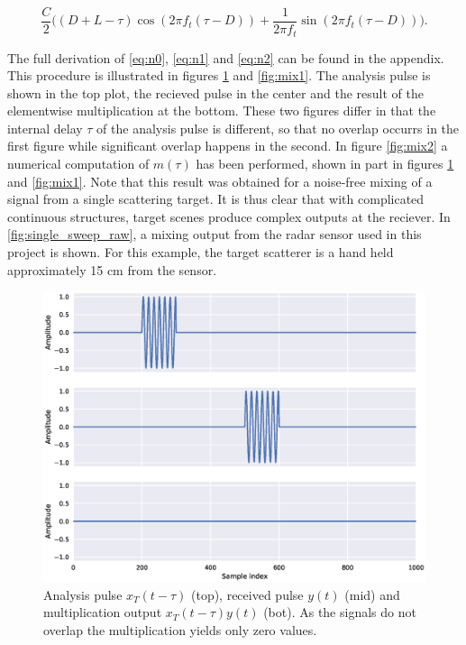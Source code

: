 \begin{equation}\label{eq:n2}
	\frac{C}{2}\Big((D + L - \tau)\cos(2\pi f_t(\tau - D)) 
	+ \frac{1}{2\pi f_t}\sin(2\pi f_t(\tau - D))\Big).
\end{equation}

The full derivation of \ref{eq:n0}, \ref{eq:n1} and \ref{eq:n2} can be found in the appendix. This procedure is illustrated in figures \ref{fig:mix0} and \ref{fig:mix1}. The analysis pulse is shown in the top plot, the recieved pulse in the center and the result of the elementwise multiplication at the bottom. These two figures differ in that the internal delay $\tau$ of the analysis pulse is different, so that no overlap occurrs in the first figure while significant overlap happens in the second. In figure \ref{fig:mix2} a numerical computation of $m(\tau)$ has been performed, shown in part in figures \ref{fig:mix0} and \ref{fig:mix1}. Note that this result was obtained for a noise-free mixing of a signal from a single scattering target. It is thus clear that with complicated continuous structures, target scenes produce complex outputs at the reciever. In \ref{fig:single_sweep_raw}, a mixing output from the radar sensor used in this project is shown. For this example, the target scatterer is a hand held approximately 15 cm from the sensor. 

\begin{figure}[h]
	\centering
	\includegraphics[scale=0.5]{figs_temp/mixing0}
	\caption{Analysis pulse $x_T(t-\tau)$ (top), received pulse $y(t)$ (mid) and multiplication output $x_T(t-\tau)y(t)$ (bot). As the signals do not overlap the multiplication yields only zero values.}
	\label{fig:mix0}
\end{figure}

